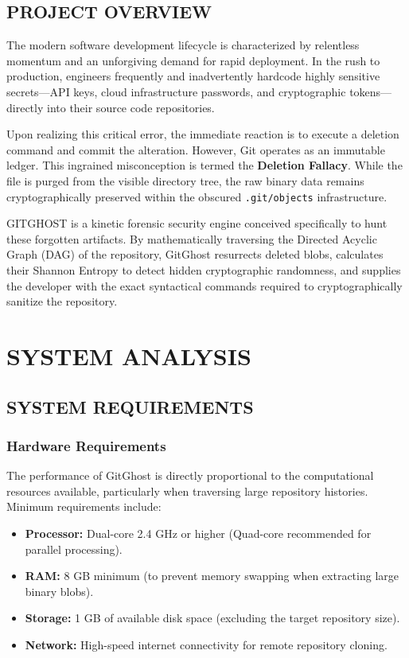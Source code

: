 \documentclass[12pt, a4paper, oneside]{report}
\begin{document}
\section{PROJECT OVERVIEW}
The modern software development lifecycle is characterized by relentless momentum and an unforgiving demand for rapid deployment. In the rush to production, engineers frequently and inadvertently hardcode highly sensitive secrets—API keys, cloud infrastructure passwords, and cryptographic tokens—directly into their source code repositories. 

Upon realizing this critical error, the immediate reaction is to execute a deletion command and commit the alteration. However, Git operates as an immutable ledger. This ingrained misconception is termed the \textbf{Deletion Fallacy}. While the file is purged from the visible directory tree, the raw binary data remains cryptographically preserved within the obscured \texttt{.git/objects} infrastructure.

GITGHOST is a kinetic forensic security engine conceived specifically to hunt these forgotten artifacts. By mathematically traversing the Directed Acyclic Graph (DAG) of the repository, GitGhost resurrects deleted blobs, calculates their Shannon Entropy to detect hidden cryptographic randomness, and supplies the developer with the exact syntactical commands required to cryptographically sanitize the repository.

\chapter{SYSTEM ANALYSIS}

\section{SYSTEM REQUIREMENTS}

\subsection{Hardware Requirements}
The performance of GitGhost is directly proportional to the computational resources available, particularly when traversing large repository histories. Minimum requirements include:
\begin{itemize}
    \item \textbf{Processor:} Dual-core 2.4 GHz or higher (Quad-core recommended for parallel processing).
    \item \textbf{RAM:} 8 GB minimum (to prevent memory swapping when extracting large binary blobs).
    \item \textbf{Storage:} 1 GB of available disk space (excluding the target repository size).
    \item \textbf{Network:} High-speed internet connectivity for remote repository cloning.
\end{itemize}
\end{document}
